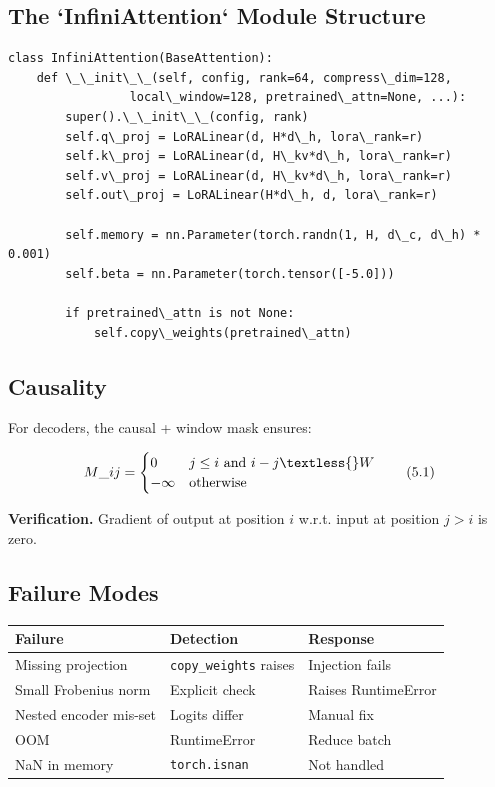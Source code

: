 \subsection{The `InfiniAttention` Module Structure}

\begin{lstlisting}
class InfiniAttention(BaseAttention):
    def \_\_init\_\_(self, config, rank=64, compress\_dim=128,
                 local\_window=128, pretrained\_attn=None, ...):
        super().\_\_init\_\_(config, rank)
        self.q\_proj = LoRALinear(d, H*d\_h, lora\_rank=r)
        self.k\_proj = LoRALinear(d, H\_kv*d\_h, lora\_rank=r)
        self.v\_proj = LoRALinear(d, H\_kv*d\_h, lora\_rank=r)
        self.out\_proj = LoRALinear(H*d\_h, d, lora\_rank=r)
        
        self.memory = nn.Parameter(torch.randn(1, H, d\_c, d\_h) * 0.001)
        self.beta = nn.Parameter(torch.tensor([-5.0]))
        
        if pretrained\_attn is not None:
            self.copy\_weights(pretrained\_attn)
\end{lstlisting}

\subsection{Causality}

For decoders, the causal + window mask ensures:

\[
M\_{ij} = \begin{cases} 0 & j \leq i \text{ and } i - j \textless{} W \\ -\infty & \text{otherwise} \end{cases}
\tag{5.1}
\]

\textbf{Verification.} Gradient of output at position $i$ w.r.t. input at 
position $j > i$ is zero.

\subsection{Failure Modes}

\begin{table}[H]
\centering
\small
\begin{tabular}{lll}
\toprule
\textbf{Failure} & \textbf{Detection} & \textbf{Response} \\
\midrule
Missing projection & \texttt{copy\_weights} raises & Injection fails \\
Small Frobenius norm & Explicit check & Raises RuntimeError \\
Nested encoder mis-set & Logits differ & Manual fix \\
OOM & RuntimeError & Reduce batch \\
NaN in memory & \texttt{torch.isnan} & Not handled \\
\bottomrule
\end{tabular}
\end{table}

